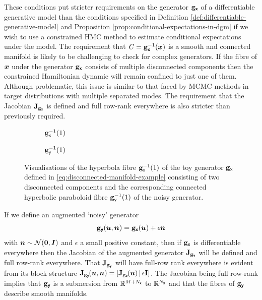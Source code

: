 These conditions put stricter requirements on the generator ${\mathbf{g}}_{\boldsymbol{\mathsf{x}}}$ of a differentiable generative model than the conditions specified in Definition \ref{def:differentiable-generative-model} and Proposition \ref{prop:conditional-expectations-in-dgm} if we wish to use a constrained \ac{HMC} method to estimate conditional expectations under the model. The requirement that $\mathit{C} = {\mathbf{g}}_{\boldsymbol{\mathsf{x}}}^{-1}(\boldsymbol{x})$ is a smooth and connected manifold is likely to be challenging to check for complex generators. If the fibre of $\boldsymbol{x}$ under the generator ${\mathbf{g}}_{\boldsymbol{\mathsf{x}}}$ consists of multiple disconnected components then the constrained Hamiltonian dynamic will remain confined to just one of them. Although problematic, this issue is similar to that faced by \ac{MCMC} methods in target distributions with multiple separated modes. The requirement that the Jacobian $\mathbf{J}_{{\mathbf{g}}_{\boldsymbol{\mathsf{x}}}}$ is defined and full row-rank everywhere is also stricter than previously required.

\begin{figure}[t]
\begin{subfigure}[b]{0.48\linewidth}
\centering
  \caption{${\mathbf{g}}_{\mathsf{x}}^{-1}(1)$}
  \label{sfig:disconnected-manifold-example-orig}
\end{subfigure}
\begin{subfigure}[b]{0.48\linewidth}
\centering
  \caption{${\mathbf{g}}_{\mathsf{y}}^{-1}(1)$}
  \label{sfig:disconnected-manifold-example-noisy}
\end{subfigure}
\caption[Disconnected manifold example.]{Visualisations of the hyperbola fibre ${\mathbf{g}}_{\mathsf{x}}^{-1}(1)$ of the toy generator ${\mathbf{g}}_{\mathsf{x}}$ defined in \eqref{eq:disconnected-manifold-example} consisting of two disconnected components and the corresponding connected hyperbolic paraboloid fibre ${\mathbf{g}}_{\mathsf{y}}^{-1}(1)$ of the noisy generator.}
\label{fig:disconnected-manifold-example}
\end{figure}

If we define an augmented `noisy' generator
\begin{equation}
  {\mathbf{g}}_{\boldsymbol{\mathsf{y}}}(\boldsymbol{u},\boldsymbol{n}) = {\mathbf{g}}_{\boldsymbol{\mathsf{x}}}(\boldsymbol{u}) + \epsilon \boldsymbol{n}
\end{equation}
with $\vct{n} \sim \nrm{\vct{0},\mtx{I}}$ and $\epsilon$ a small positive constant, then if ${\mathbf{g}}_{\boldsymbol{\mathsf{x}}}$ is differentiable everywhere then the Jacobian of the augmented generator $\mathbf{J}_{{\mathbf{g}}_{\boldsymbol{\mathsf{y}}}}$ will be defined and full row-rank everywhere. That $\mathbf{J}_{{\mathbf{g}}_{\boldsymbol{\mathsf{y}}}}$ will have full-row rank everywhere is evident from its block structure $\jacob{\genfunc_{\rvct{y}}}{\vct{u},\vct{n}} = \lsb \jacob{\genfunc_{\rvct{x}}}{\vct{u}} \,\middle|\, \epsilon\idmtx \rsb$. The Jacobian being full row-rank implies that ${\mathbf{g}}_{\boldsymbol{\mathsf{y}}}$ is a submersion from $\mathbb{R}^{M + N_{\boldsymbol{\mathsf{x}}}}$ to $\mathbb{R}^{N_{\boldsymbol{\mathsf{x}}}}$ and that the fibres of ${\mathbf{g}}_{\boldsymbol{\mathsf{y}}}$ describe smooth manifolds. 

